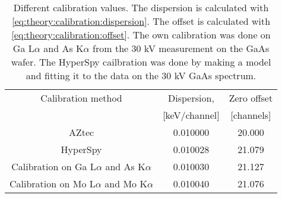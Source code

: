 \begin{table}[p]
    \centering
    \caption{
        Different calibration values.
        The dispersion is calculated with \cref{eq:theory:calibration:dispersion}.
        The offset is calculated with \cref{eq:theory:calibration:offset}.
        The own calibration was done on Ga L$\alpha$ and As K$\alpha$ from the 30 kV measurement on the GaAs wafer.
        The HyperSpy cailbration was done by making a model and fitting it to the data on the 30 kV GaAs spectrum.
    }
    \label{tab:results:calibrations}
    \begin{tabular}{ccc}
        Calibration method                           & Dispersion,   & Zero offset \\
                                                     & [keV/channel] & [channels]  \\
        \hline
        AZtec                                        & 0.010000      & 20.000      \\
        HyperSpy                                     & 0.010028      & 21.079      \\
        Calibration on Ga L$\alpha$ and As K$\alpha$ & 0.010030      & 21.127      \\
        Calibration on Mo L$\alpha$ and Mo K$\alpha$ & 0.010040      & 21.076
    \end{tabular}
\end{table}
